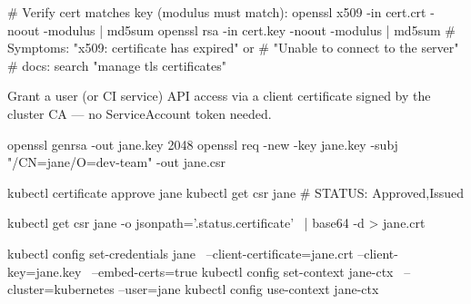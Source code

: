 \begin{tcbitemize}[
  raster columns=3, raster equal height=rows,
  blanker, cheat subtitle
]

    \begin{cheatcodebash}
    # Verify cert matches key (modulus must match):
    openssl x509 -in cert.crt -noout -modulus | md5sum
    openssl rsa  -in cert.key -noout -modulus | md5sum
    # Symptoms: "x509: certificate has expired" or
    # "Unable to connect to the server"
    # docs: search "manage tls certificates"
    \end{cheatcodebash}

  \tcbitem
    {\fontsize{6.5}{7.5}\selectfont\sffamily
    Grant a user (or CI service) API access via a client certificate signed by the cluster CA — no ServiceAccount token needed.\par}

    \begin{cheatcodebash}
    openssl genrsa -out jane.key 2048
    openssl req -new -key jane.key -subj "/CN=jane/O=dev-team" -out jane.csr
    \end{cheatcodebash}


    \begin{cheatcodebash}
    kubectl certificate approve jane
    kubectl get csr jane    # STATUS: Approved,Issued
    \end{cheatcodebash}

    \begin{cheatcodebash}
    kubectl get csr jane -o jsonpath='{.status.certificate}' \
      | base64 -d > jane.crt
    \end{cheatcodebash}

    \begin{cheatcodebash}
    kubectl config set-credentials jane \
      --client-certificate=jane.crt --client-key=jane.key \
      --embed-certs=true
    kubectl config set-context jane-ctx \
      --cluster=kubernetes --user=jane
    kubectl config use-context jane-ctx
    \end{cheatcodebash}



\end{tcbitemize}
